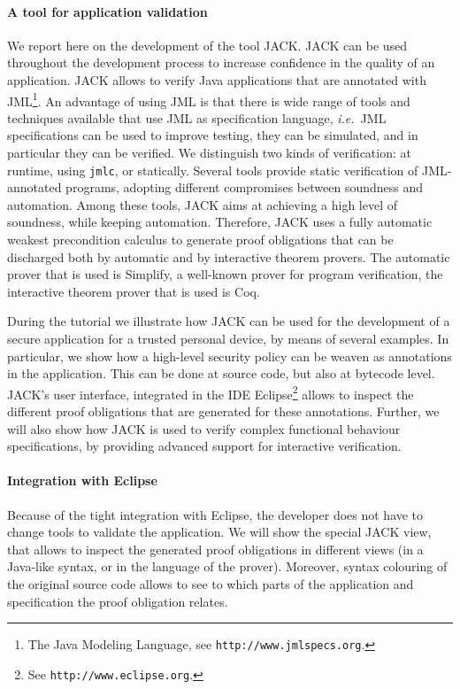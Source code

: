 \documentclass[]{llncs}
\begin{document}
\paragraph{A tool for application validation}
We report here on the development of the tool JACK. JACK can be used
throughout the development process to increase confidence in the
quality of an application. JACK allows to verify Java applications
that are annotated with JML\footnote{The Java Modeling Language, see
\texttt{http://www.jmlspecs.org}.}. An advantage of using JML is that
there is wide range of tools and techniques available that use JML as
specification language, \emph{i.e.}\ JML specifications can be used to
improve testing, they can be simulated, and in particular they can be
verified. We distinguish two kinds of verification: at runtime, using
\texttt{jmlc}, or statically. Several tools provide
static verification of JML-annotated programs, adopting different
compromises between soundness and automation.  Among these tools, JACK
aims at achieving a high level of soundness, while keeping
automation. Therefore, JACK uses a fully automatic weakest
precondition calculus to generate proof obligations that can be
discharged both by automatic and by interactive theorem provers. The
automatic prover that is used is Simplify, a well-known prover for
program verification, the interactive theorem prover that is used is
Coq.

During the tutorial we illustrate how JACK can be used for the
development of a secure application for a trusted personal device, by
means of several examples. In particular, we show how a high-level
security policy can be weaven as annotations in the application. This
can be done at source code, but also at bytecode level. JACK's user
interface, integrated in the IDE Eclipse\footnote{See
\texttt{http://www.eclipse.org}.} allows to inspect the different
proof obligations that are generated for these annotations. Further,
we will also show how JACK is used to verify complex functional
behaviour specifications, by providing advanced support for
interactive verification.


\paragraph{Integration with Eclipse}
Because of the tight integration with Eclipse, the developer does not
have to change tools to validate the application. We will show the
special JACK view, that allows to inspect the generated proof
obligations in different views (in a Java-like syntax, or in the
language of the prover). Moreover, syntax colouring of the original
source code allows to see to which parts of the application and
specification the proof obligation relates.
\end{document}
